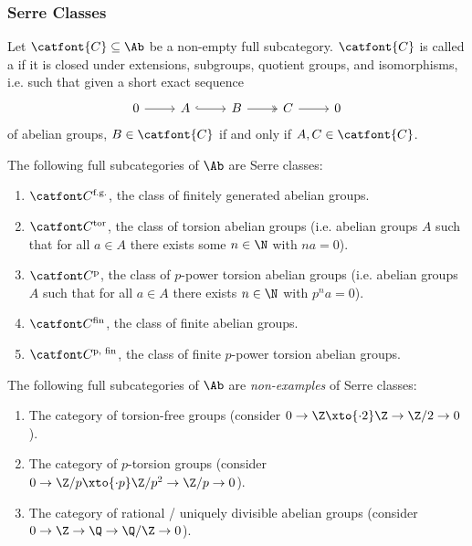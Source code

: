 \subsubsection{Serre Classes}
\begin{definition}
	Let $\catfont{C} \subseteq \Ab$ be a non-empty full subcategory.
	$\catfont{C}$ is called a  if it is closed under extensions, subgroups, quotient groups, and isomorphisms, i.e. such that given a short exact sequence 
	\begin{equation*}
		\begin{tikzcd}
			0 
					\ar[r]
				& A
					\ar[r, hook]
				& B
					\ar[r, two heads]
				& C
					\ar[r]
				& 0
		\end{tikzcd}
	\end{equation*}
	of abelian groups, $B \in \catfont{C}$ if and only if $A, C \in \catfont{C}$.
\end{definition}
\begin{example}
	The following full subcategories of $\Ab$ are Serre classes:	
	\begin{enumerate}
		\item $\Cfg$, the class of finitely generated abelian groups.
		\item $\Ctor$, the class of torsion abelian groups (i.e. abelian groups $A$ such that for all $a \in A$ there exists some $n \in \N$ with $n a = 0$).
		\item $\Cptor$, the class of $p$-power torsion abelian groups (i.e. abelian groups $A$ such that for all $a \in A$ there exists $n \in \N$ with $p^n a = 0$).
		\item $\Cfin$, the class of finite abelian groups.
		\item $\Cfinp$, the class of finite $p$-power torsion abelian groups.
	\end{enumerate}
\end{example}
\begin{example}
	The following full subcategories of $\Ab$ are \emph{non-examples} of Serre classes:
	\begin{enumerate}
		\item The category of torsion-free groups (consider $0 \to \Z \xto{\cdot 2} \Z \to \Zn{2} \to 0$).
		\item The category of $p$-torsion groups (consider $0 \to \Zn{p} \xto{\cdot p} \Zn{p^2} \to \Zn{p} \to 0$).
		\item The category of rational / uniquely divisible abelian groups (consider $0 \to \Z \to \Q \to \Q / \Z \to 0$).
	\end{enumerate}
\end{example}

